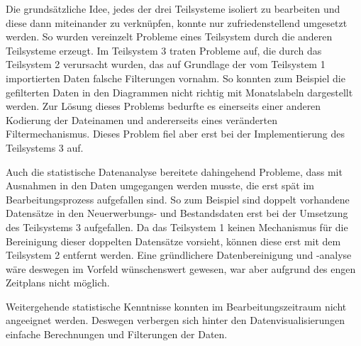 Die grundsätzliche Idee, jedes der drei Teilsysteme isoliert zu bearbeiten und diese dann miteinander zu verknüpfen, 
konnte nur zufriedenstellend umgesetzt werden. So wurden vereinzelt Probleme eines Teilsystem durch die anderen Teilsysteme erzeugt. 
Im Teilsystem 3 traten Probleme auf, die durch das Teilsystem 2 verursacht wurden, das auf Grundlage der 
vom Teilsystem 1 importierten Daten falsche Filterungen vornahm. So konnten zum Beispiel die gefilterten Daten 
in den Diagrammen nicht richtig mit Monatslabeln dargestellt werden. Zur Lösung dieses Problems bedurfte es einerseits einer 
anderen Kodierung der Dateinamen und andererseits eines veränderten Filtermechanismus. Dieses Problem fiel aber erst bei der 
Implementierung des Teilsystems 3 auf. 

Auch die statistische Datenanalyse bereitete dahingehend Probleme, dass mit Ausnahmen in den Daten umgegangen werden musste, die erst spät im Bearbeitungsprozess aufgefallen sind. 
So zum Beispiel sind doppelt vorhandene Datensätze in den Neuerwerbungs- und Bestandsdaten erst bei der Umsetzung des Teilsystems 3
aufgefallen. Da das Teilsystem 1 keinen Mechanismus für die Bereinigung dieser doppelten Datensätze vorsieht, können diese erst mit dem Teilsystem 2 entfernt werden.
Eine gründlichere Datenbereinigung und -analyse wäre deswegen im Vorfeld wünschenswert gewesen, war aber aufgrund des engen Zeitplans nicht möglich.





Weitergehende statistische Kenntnisse konnten im Bearbeitungszeitraum nicht angeeignet werden. Deswegen verbergen sich hinter den Datenvisualisierungen einfache Berechnungen und Filterungen der Daten.


